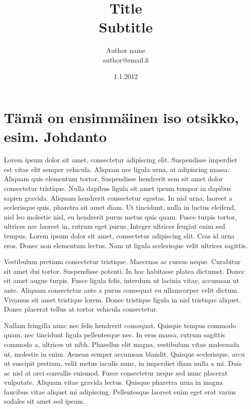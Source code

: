 \documentclass[a4paper]{article}
\begin{document}
\title{\huge Title \\ \large Subtitle}
\date{1.1.2012}
\author{Author name \\ author@email.fi}
\maketitle

\large

\section{Tämä on ensimmäinen iso otsikko, esim. Johdanto}

Lorem ipsum dolor sit amet, consectetur adipiscing elit. Suspendisse imperdiet est vitae elit semper vehicula. Aliquam nec ligula urna, at adipiscing massa. Aliquam quis elementum tortor. Suspendisse hendrerit sem sit amet dolor consectetur tristique. Nulla dapibus ligula sit amet ipsum tempor in dapibus sapien gravida. Aliquam hendrerit consectetur egestas. In nisl urna, laoreet a scelerisque quis, pharetra sit amet diam. Ut tincidunt, nulla in luctus eleifend, nisl leo molestie nisl, eu hendrerit purus metus quis quam. Fusce turpis tortor, ultrices nec laoreet in, rutrum eget purus. Integer ultrices feugiat enim sed tempus. Lorem ipsum dolor sit amet, consectetur adipiscing elit. Cras id urna eros. Donec non elementum lectus. Nam ut ligula scelerisque velit ultrices sagittis.

Vestibulum pretium consectetur tristique. Maecenas ac cursus neque. Curabitur sit amet dui tortor. Suspendisse potenti. In hac habitasse platea dictumst. Donec sit amet augue turpis. Fusce ligula felis, interdum ut lacinia vitae, accumsan ut ante. Aliquam consectetur ante a purus consequat eu ullamcorper velit dictum. Vivamus sit amet tristique lorem. Donec tristique ligula in nisl tristique aliquet. Donec placerat tellus at tortor vehicula consectetur.

Nullam fringilla nunc nec felis hendrerit consequat. Quisque tempus commodo quam, nec tincidunt ligula pellentesque nec. In eros massa, rutrum sagittis commodo a, ultrices ut nibh. Phasellus elit magna, vestibulum vitae malesuada ut, molestie in enim. Aenean semper accumsan blandit. Quisque scelerisque, arcu ut suscipit pretium, velit metus iaculis nunc, in imperdiet diam nulla a mi. Duis ac nisl at orci convallis euismod. Fusce consectetur neque sed nunc placerat vulputate. Aliquam vitae gravida lectus. Quisque pharetra urna in magna faucibus vitae aliquet mi adipiscing. Pellentesque laoreet enim eget erat varius sodales sit amet sed ipsum.
\end{document}
